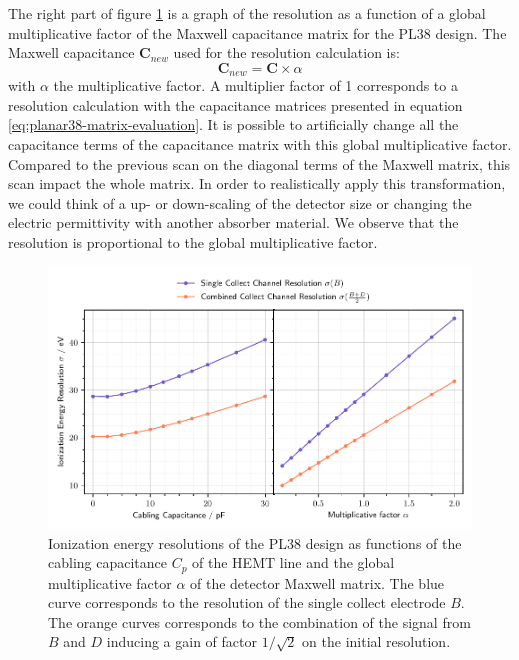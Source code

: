 The right part of figure \ref{fig:planar38-scan} is a graph of the resolution as a function of a global multiplicative factor of the Maxwell capacitance matrix for the PL38 design. The Maxwell capacitance $\bm{C}_{new}$ used for the resolution calculation is:
\begin{equation}
\bm{C}_{new} = \bm{C} \times \alpha
\end{equation}
with $\alpha$ the multiplicative factor. A multiplier factor of 1 corresponds to a resolution calculation with the capacitance matrices presented in equation \ref{eq:planar38-matrix-evaluation}. It is possible to artificially change all the capacitance terms of the capacitance matrix with this global multiplicative factor. Compared to the previous scan on the diagonal terms of the Maxwell matrix, this scan impact the whole matrix. In order to realistically apply this transformation, we could think of a up- or down-scaling of the detector size or changing the electric permittivity with another absorber material. We observe that the resolution is proportional to the global multiplicative factor.

\begin{figure}
\centering
\includegraphics[scale=1]{Figures/Electrodes/pl38_scanplot.pdf}
\caption{Ionization energy resolutions of the PL38 design as functions of the cabling capacitance $C_p$ of the HEMT line and the global multiplicative factor $\alpha$ of the detector Maxwell matrix. The blue curve corresponds to the resolution of the single collect electrode $B$. The orange curves corresponds to the combination of the signal from $B$ and $D$ inducing a gain of factor $1/\sqrt{2}$ on the initial resolution.
}
\label{fig:planar38-scan}
\end{figure}


